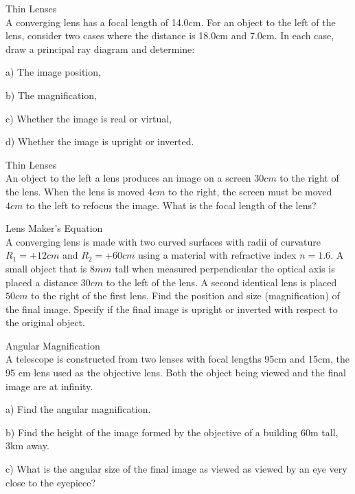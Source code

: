 \documentclass[10pt]{article}
\newenvironment{problem}[2][Problem]{\begin{trivlist}
\item[\hskip \labelsep {\bfseries #1}\hskip \labelsep {\bfseries #2.}]}{\end{trivlist}}
\begin{document}
\begin{problem}{6} Thin Lenses\\
A converging lens has a focal length of 14.0cm. For an object to the left of the lens, consider two cases where the distance is 18.0cm and 7.0cm. In each case, draw a principal ray diagram and determine:
\item a) The image position,
\item b) The magnification,
\item c) Whether the image is real or virtual,
\item d) Whether the image is upright or inverted.
\end{problem}

\begin{problem}{7} Thin Lenses\\
An object to the left a lens produces an image on a screen $30cm$ to the right of the lens. When the lens is moved $4cm$ to the right, the screen must be moved $4cm$ to the left to refocus the image. What is the focal length of the lens?
\end{problem}

\begin{problem}{8} Lens Maker's Equation\\
A converging lens is made with two curved surfaces with radii of curvature $R_1=+12cm$ and $R_2=+60cm$ using a material with refractive index $n=1.6$. A small object that is $8mm$ tall when measured perpendicular the optical axis is placed a distance $30cm$ to the left of the lens. A second identical lens is placed $50cm$ to the right of the first lens. Find the position and size (magnification) of the final image. Specify if the final image is upright or inverted with respect to the original object.
\end{problem}

\begin{problem}{9} Angular Magnification\\
A telescope is constructed from two lenses with focal lengths 95cm and 15cm, the 95 cm lens used as the objective lens. Both the object being viewed and the final image are at infinity.
\item a) Find the angular magnification.
\item b) Find the height of the image formed by the objective of a building 60m tall, 3km away.
\item c) What is the angular size of the final image as viewed as viewed by an eye very close to the eyepiece?
\end{problem}







\end{document}
